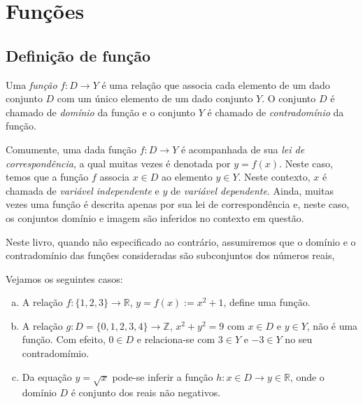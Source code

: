 
\chapter{Funções}\label{cap:funcoes}

\section{Definição de função}

\begin{defn}
  Uma \emph{função} $f:D \to Y$ é uma relação que associa cada elemento de um dado conjunto $D$ com um único elemento de um dado conjunto $Y$. O conjunto $D$ é chamado de \emph{domínio} da função e o conjunto $Y$ é chamado de \emph{contradomínio} da função.
\end{defn}

Comumente, uma dada função $f:D\to Y$ é acompanhada de sua \emph{lei de correspondência}, a qual muitas vezes é denotada por $y = f(x)$. Neste caso, temos que a função $f$ associa $x\in D$ ao elemento $y\in Y$. Neste contexto, $x$ é chamada de \emph{variável independente} e $y$ de \emph{variável dependente}. Ainda, muitas vezes uma função é descrita apenas por sua lei de correspondência e, neste caso, os conjuntos domínio e imagem são inferidos no contexto em questão.

\begin{obs}
  Neste livro, quando não especificado ao contrário, assumiremos que o domínio e o contradomínio das funções consideradas são subconjuntos dos números reais,
\end{obs}

\begin{ex} Vejamos os seguintes casos:
  \begin{enumerate}[a)]
  \item A relação $f:\{1,2,3\}\to\mathbb{R}$, $y = f(x) := x^2 + 1$, define uma função.
  \item A relação $g:D=\{0,1,2,3,4\}\to\mathbb{Z}$, $x^2 + y^2 = 9$ com $x\in D$ e $y\in Y$, não é uma função. Com efeito, $0\in D$ e relaciona-se com $3\in Y$ e $-3\in Y$ no seu contradomímio.
  \item Da equação $y = \sqrt{x}$ pode-se inferir a função $h:x\in D \to y\in\mathbb{R}$, onde o domínio $D$ é conjunto dos reais não negativos.
  \end{enumerate}
\end{ex}

